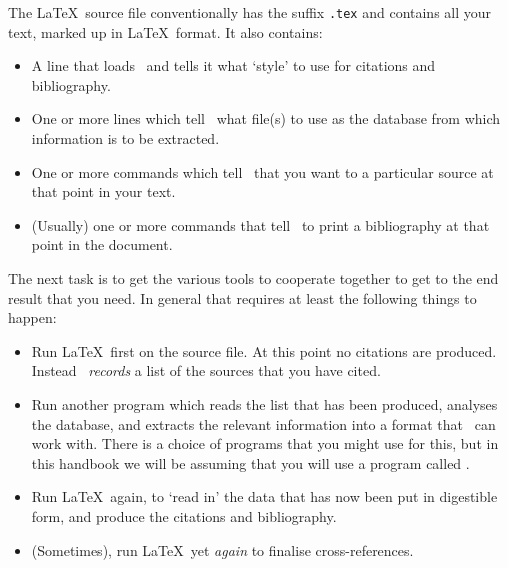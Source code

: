 The \LaTeX\ source file conventionally has the suffix \texttt{.tex}
and contains all your text, marked up in \LaTeX\ format. It also
contains:
\begin{itemize}
\item A line that
  loads \biblatex\ and tells it what `style' to use for citations and
  bibliography.
\item One or more lines
  which tell \biblatex\ what file(s) to use as the database from which
  information is to be extracted.
\item One or more commands which tell
  \biblatex\ that you want to  a particular source at that
  point in your text.
\item (Usually) one or more
  commands that tell \biblatex\ to print a bibliography at that point
  in the document.
\end{itemize}

The next task is to get the various tools to cooperate together to get
to the end result that you need. 
In general that requires at least the
following things to happen:
\begin{itemize}
\item Run \LaTeX\ first on the source file. At this point no citations
  are produced. Instead \biblatex\ \emph{records} a list of the
  sources that you have cited.
\item Run another program which reads the list that has been produced,
  analyses the database, and extracts the relevant information into a
  format that \biblatex\ can work with. There is a choice of programs
  that you might use for this, but in this handbook we will be
  assuming that you will use a program called .
\item Run \LaTeX\ again, to `read in' the data that has now been put
  in digestible form, and produce the citations and bibliography.
\item (Sometimes), run \LaTeX\ yet \emph{again} to finalise
  cross-references.
\end{itemize}

